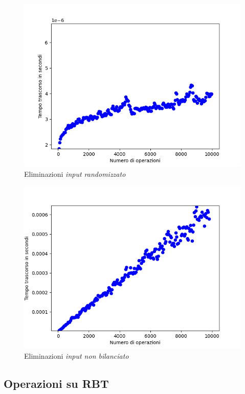 \documentclass{article}
\begin{document}
			\begin{figure}[h!]
				\centering
				\includegraphics[scale = 0.8]{BST_Deletions}
				\caption{Eliminazioni \textit{input randomizzato}}
			\end{figure}
			\begin{figure}[h!]
				\centering
				\includegraphics[scale = 0.8]{BST_Unbalanced_Deletions}
				\caption{Eliminazioni \textit{input non bilanciato}}
			\end{figure}
				
		\clearpage
		\subsection{Operazioni su RBT}
\end{document}
